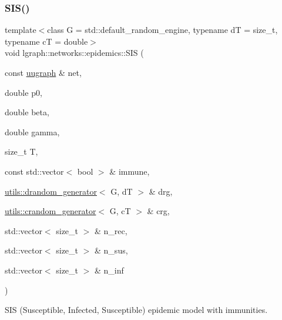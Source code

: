 \subsubsection{\texorpdfstring{S\+I\+S()}{SIS()}\hspace{0.1cm}{\footnotesize\ttfamily [2/2]}}
{\footnotesize\ttfamily template$<$class G  = std\+::default\+\_\+random\+\_\+engine, typename dT  = size\+\_\+t, typename cT  = double$>$ \\
void lgraph\+::networks\+::epidemics\+::\+S\+IS (\begin{DoxyParamCaption}\item[{const \hyperlink{classlgraph_1_1uugraph}{uugraph} \&}]{net,  }\item[{double}]{p0,  }\item[{double}]{beta,  }\item[{double}]{gamma,  }\item[{size\+\_\+t}]{T,  }\item[{const std\+::vector$<$ bool $>$ \&}]{immune,  }\item[{\hyperlink{classlgraph_1_1utils_1_1drandom__generator}{utils\+::drandom\+\_\+generator}$<$ G, dT $>$ \&}]{drg,  }\item[{\hyperlink{classlgraph_1_1utils_1_1crandom__generator}{utils\+::crandom\+\_\+generator}$<$ G, cT $>$ \&}]{crg,  }\item[{std\+::vector$<$ size\+\_\+t $>$ \&}]{n\+\_\+rec,  }\item[{std\+::vector$<$ size\+\_\+t $>$ \&}]{n\+\_\+sus,  }\item[{std\+::vector$<$ size\+\_\+t $>$ \&}]{n\+\_\+inf }\end{DoxyParamCaption})}



S\+IS (Susceptible, Infected, Susceptible) epidemic model with immunities. 


